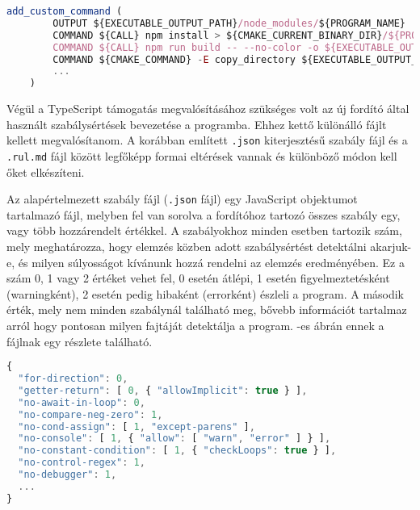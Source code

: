 \begin{lstlisting}[caption={CMake parancs modul mappa másolására},label={lst:cmakeeslint}, language={JavaScript}]
    add_custom_command (
        OUTPUT ${EXECUTABLE_OUTPUT_PATH}/node_modules/${PROGRAM_NAME}
        COMMAND ${CALL} npm install > ${CMAKE_CURRENT_BINARY_DIR}/${PROGRAM_NAME}-npm-install.log 2>&1
        COMMAND ${CALL} npm run build -- --no-color -o ${EXECUTABLE_OUTPUT_PATH}/node_modules/${PROGRAM_NAME} > ${CMAKE_CURRENT_BINARY_DIR}/${PROGRAM_NAME}-npm-build.log 2>&1
        COMMAND ${CMAKE_COMMAND} -E copy_directory ${EXECUTABLE_OUTPUT_PATH}/tmp_${PROGRAM_NAME}/node_modules/ ${EXECUTABLE_OUTPUT_PATH}/node_modules/${PROGRAM_NAME}/node_modules/
        ...
    )
\end{lstlisting}

Végül a TypeScript támogatás megvalósításához szükséges volt az új fordító által használt szabálysértések bevezetése a programba. Ehhez kettő különálló fájlt kellett megvalósítanom. A korábban említett \texttt{.json} kiterjesztésű szabály fájl és a \texttt{.rul.md} fájl között legfőképp formai eltérések vannak és különböző módon kell őket elkészíteni.

Az alapértelmezett szabály fájl (\texttt{.json} fájl) egy JavaScript objektumot tartalmazó fájl, melyben fel van sorolva a fordítóhoz tartozó összes szabály egy, vagy több hozzárendelt értékkel. A szabályokhoz minden esetben tartozik szám, mely meghatározza, hogy elemzés közben adott szabálysértést detektálni akarjuk-e, és milyen súlyosságot kívánunk hozzá rendelni az elemzés eredményében. Ez a szám 0, 1 vagy 2 értéket vehet fel, 0 esetén átlépi, 1 esetén figyelmeztetésként (warningként), 2 esetén pedig hibaként (errorként) észleli a program. A második érték, mely nem minden szabálynál található meg, bővebb információt tartalmaz arról hogy pontosan milyen fajtáját detektálja a program. -es ábrán ennek a fájlnak egy részlete található.

\begin{lstlisting}[caption={Szabálysértések megadása \texttt{.json} állományban},label={lst:jsonconfig}, language={JavaScript}]
{ 
  "for-direction": 0,
  "getter-return": [ 0, { "allowImplicit": true } ],
  "no-await-in-loop": 0,
  "no-compare-neg-zero": 1,
  "no-cond-assign": [ 1, "except-parens" ],
  "no-console": [ 1, { "allow": [ "warn", "error" ] } ],
  "no-constant-condition": [ 1, { "checkLoops": true } ],
  "no-control-regex": 1,
  "no-debugger": 1,
  ...
}
\end{lstlisting}

